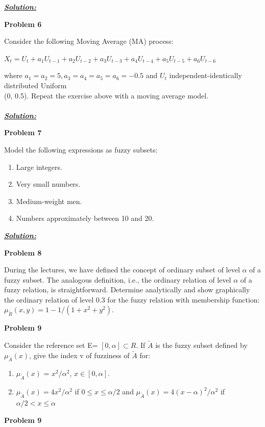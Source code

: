 \documentclass{article}
\begin{document}
\vspace{1cm}

\noindent \underline{\textbf{\textit{Solution:}}}


\newpage
\noindent \textbf{Problem 6}

\noindent Consider the following Moving Average (MA) process:
\begin{center}
    $X_t = U_t + a_1U_{t-1} + a_2U_{t-2} + a_3U_{t-3} + a_4U_{t-4}+ a_5U_{t-5}+ a_6U_{t-6}$
\end{center}
\noindent where $a_1= a_2=5, a_3=a_4=a_5=a_6= -0.5$ and $U_t$ independent-identically distributed Uniform \\
(0, 0.5). 
Repeat the exercise above with a moving average model. \\ \\

\noindent \underline{\textbf{\textit{Solution:}}}



\newpage
\noindent \textbf{Problem 7}

\noindent Model the following expressions as fuzzy subsets:
\begin{enumerate} [label = \Alph*]
    \item Large integers.
    \item Very small numbers.
    \item Medium-weight men.
    \item Numbers approximately between 10 and 20.
\end{enumerate}

\vspace{1cm}

\noindent \underline{\textbf{\textit{Solution:}}}


\newpage
\noindent \textbf{Problem 8}

\noindent During the lectures, we have defined the concept of ordinary subset of level $\alpha$ of a fuzzy 
subset. The analogous definition, i.e., the ordinary relation of level $\alpha$ of a fuzzy relation, is 
straightforward. Determine analytically and show graphically the ordinary relation of level 
0.3 for the fuzzy relation with membership function: $\mu_{\utilde{R}}(x, y) = 1 - 1/(1+x^2+y^2)$.



\newpage
\noindent \textbf{Problem 9}

\noindent Consider the reference set E= $[0, \alpha] \subset R$. If $\utilde{A}$ is the fuzzy subset defined by 
$\mu_{\utilde{A}}(x)$, give the index v of fuzziness of $\utilde{A}$ for:

\begin{enumerate} [label=\Alph*]
  \item $\mu_{\utilde{A}}(x)$ = $x^2/\alpha^2$, $x \in [0, \alpha].$
  \item $\mu_{\utilde{A}}(x) = 4x^2/\alpha^2$ if $0 \leq x\leq \alpha/2$ and $\mu_{\utilde{A}}(x) = 4(x-\alpha)^2/\alpha^2$ if $\alpha/2  <x \leq \alpha$
\end{enumerate}


\newpage
\noindent \textbf{Problem 9}

\noindent
  
\end{document}
